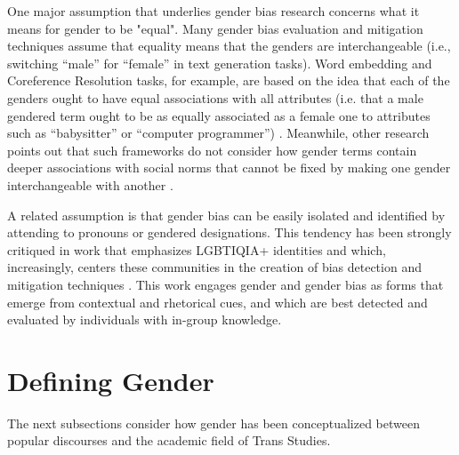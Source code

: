 \documentclass[11pt]{article}
\begin{document}
One major assumption that underlies gender bias research concerns what it means for gender to be "equal". Many gender bias evaluation and mitigation techniques assume that equality means that the genders are interchangeable (i.e., switching “male” for “female” in text generation tasks). Word embedding and Coreference Resolution tasks, for example, are based on the idea that each of the genders ought to have equal associations with all attributes (i.e. that a male gendered term ought to be as equally associated as a female one to attributes such as “babysitter” or “computer programmer”) \citep{bolukbasi:2016,rudinger:2018,guo:2021}. Meanwhile, other research points out that such frameworks do not consider how gender terms contain deeper associations with social norms that cannot be fixed by making one gender interchangeable with another \citep{blodgett:2020,gonen:2019}. 

A related assumption is that gender bias can be easily isolated and identified by attending to pronouns or gendered designations. This tendency has been strongly critiqued in work that emphasizes LGBTIQIA+ identities and which, increasingly, centers these communities in the creation of bias detection and mitigation techniques \citep{felkner:2023,devinney:2020,lameiro:2025,ovalle:2023,hafner:2025,calado:2025}. This work engages gender and gender bias as forms that emerge from contextual and rhetorical cues, and which are best detected and evaluated by individuals with in-group knowledge.

\section{Defining Gender}

The next subsections consider how gender has been conceptualized between popular discourses and the academic field of Trans Studies.
\end{document}
